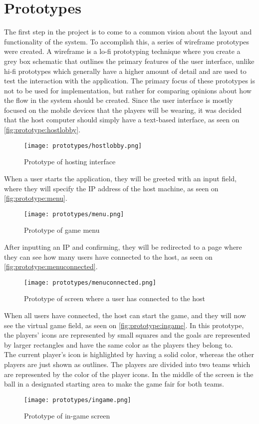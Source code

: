 \section{Prototypes}\label{sec:sprint1-prototypes}
The first step in the project is to come to a common vision about the layout and functionality of the system.
To accomplish this, a series of wireframe prototypes were created.
A wireframe is a lo-fi prototyping technique where you create a grey box schematic that outlines the primary features of the user interface, unlike hi-fi prototypes which generally have a higher amount of detail and are used to test the interaction with the application.
The primary focus of these prototypes is not to be used for implementation, but rather for comparing opinions about how the flow in the system should be created.
Since the user interface is mostly focused on the mobile devices that the players will be wearing, it was decided that the host computer should simply have a text-based interface, as seen on \autoref{fig:prototype:hostlobby}.

\begin{figure}[H]
    \centering
    \texttt{[image: prototypes/hostlobby.png]}
    \caption{Prototype of hosting interface}
    \label{fig:prototype:hostlobby}
\end{figure}
\noindent
When a user starts the application, they will be greeted with an input field, where they will specify the IP address of the host machine, as seen on \autoref{fig:prototype:menu}. 

\begin{figure}[H]
    \centering
    \texttt{[image: prototypes/menu.png]}
    \caption{Prototype of game menu}
    \label{fig:prototype:menu}
\end{figure}
\noindent
After inputting an IP and confirming, they will be redirected to a page where they can see how many users have connected to the host, as seen on \autoref{fig:prototype:menuconnected}. 

\begin{figure}[H]
    \centering
    \texttt{[image: prototypes/menuconnected.png]}
    \caption{Prototype of screen where a user has connected to the host}
    \label{fig:prototype:menuconnected}
\end{figure}

\noindent
When all users have connected, the host can start the game, and they will now see the virtual game field, as seen on \autoref{fig:prototype:ingame}.
In this prototype, the players' icons are represented by small squares and the goals are represented by larger rectangles and have the same color as the players they belong to. \\
The current player's icon is highlighted by having a solid color, whereas the other players are just shown as outlines. 
The players are divided into two teams which are represented by the color of the player icons.
In the middle of the screen is the ball in a designated starting area to make the game fair for both teams.

\begin{figure}[H]
    \centering
    \texttt{[image: prototypes/ingame.png]}
    \caption{Prototype of in-game screen}
    \label{fig:prototype:ingame}
\end{figure}
